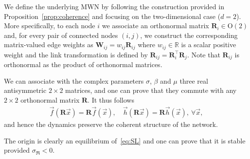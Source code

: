 \documentclass[aps,showpacs,preprintnumbers,amsmath,amssymb,twocolumn,superscriptaddress,floatfix,nofootinbib,10pt,pre]{revtex4-1}
\begin{document}
We define the underlying MWN by following the construction provided in Proposition~\ref{prop:coherence} and focusing on the two-dimensional case ($d=2$). More specifically, to each node $i$ we associate an orthonormal matrix $\mathbf R_i \in \mathrm{O}(2)$ and, for every pair of connected nodes $(i,j)$, we construct the corresponding matrix-valued edge weights as $\mathbf W_{ij}=w_{ij}\mathbf R_{ij}$ where $w_{ij}\in\mathbb R$ is a scalar positive weight and the link transformation is defined by $\mathbf R_{ij} = \mathbf R_i^\top\mathbf R_j$. Note that $\mathbf R_{ij}$ is orthonormal as the product of orthonormal matrices.

We can associate with the complex parameters $\sigma$, $\beta$ and $\mu$ three real antisymmetric $2\times 2$ matrices, and one can prove that they commute with any $2\times 2$ orthonormal matrix $\mathbf R$. It thus follows
\begin{align}
    \vec f(\mathbf R\vec x)=\mathbf R\vec f(\vec x),\quad\vec h(\mathbf R\vec x)=\mathbf R\vec h(\vec x),\:\forall\vec x,
\end{align}
and hence the dynamics preserve the coherent structure of the network.

The origin is clearly an equilibrium of~\eqref{eq:SL} and one can prove that it is stable provided $\sigma_{\Re}<0$.
\end{document}
